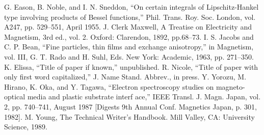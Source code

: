 \documentclass[conference]{IEEEtran}
\begin{document}
\begin{thebibliography}{plain}
 G. Eason, B. Noble, and I. N. Sneddon, ``On certain integrals of Lipschitz-Hankel type involving products of Bessel functions,'' Phil. Trans. Roy. Soc. London, vol. A247, pp. 529--551, April 1955.
 J. Clerk Maxwell, A Treatise on Electricity and Magnetism, 3rd ed., vol. 2. Oxford: Clarendon, 1892, pp.68--73.
 I. S. Jacobs and C. P. Bean, ``Fine particles, thin films and exchange anisotropy,'' in Magnetism, vol. III, G. T. Rado and H. Suhl, Eds. New York: Academic, 1963, pp. 271--350.
 K. Elissa, ``Title of paper if known,'' unpublished.
 R. Nicole, ``Title of paper with only first word capitalized,'' J. Name Stand. Abbrev., in press.
 Y. Yorozu, M. Hirano, K. Oka, and Y. Tagawa, ``Electron spectroscopy studies on magneto-optical media and plastic substrate interf	ace,'' IEEE Transl. J. Magn. Japan, vol. 2, pp. 740--741, August 1987 [Digests 9th Annual Conf. Magnetics Japan, p. 301, 1982].
 M. Young, The Technical Writer's Handbook. Mill Valley, CA: University Science, 1989.
\end{thebibliography}
\end{document}
